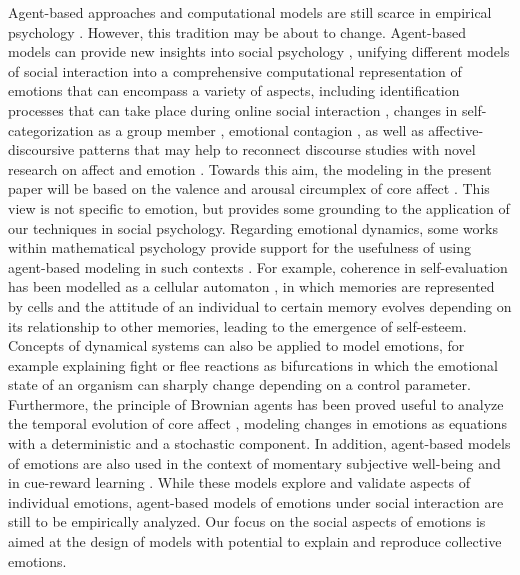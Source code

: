 \documentclass[nologo,url,11pt,a4paper]{ETHpaper}
\begin{document}
Agent-based approaches and computational models are still scarce in empirical psychology \cite{Kuppens2010}. 
However, this tradition may be about to change. 
Agent-based models can provide new insights into social psychology \cite{Smith2007}, unifying different models of social interaction into a comprehensive computational representation of emotions that can encompass
a variety of aspects, including identification processes \cite{Tajfel1978} that can take place during online social interaction \cite{Cheung2011}, changes in self-categorization as a group member \cite{Seger2009}, emotional contagion \cite{Hatfield1994,Weisbuch2008}, as well as affective-discoursive patterns that may help to reconnect discourse studies with novel research on affect and emotion \cite{Wetherell2013}. Towards this aim, the modeling in the present paper will be based on the valence and arousal circumplex of core affect \cite{Russell1980,Russell2009,Yik2011}.  
This view is not specific to emotion, but provides some grounding to the application of our techniques in social psychology. 
Regarding emotional dynamics, some works within mathematical psychology provide support for the usefulness of using agent-based modeling in such contexts \cite{Scherer2009}.
For example, coherence in self-evaluation has been modelled as a cellular automaton \cite{Vallacher2002},
in which memories are represented by cells and the attitude of an individual to certain memory evolves depending on its relationship to other memories, leading to the emergence of self-esteem.
Concepts of dynamical systems can also be applied to model emotions, for example explaining fight or flee reactions as bifurcations \cite{Sander2005} in which the emotional state of an organism can sharply change depending on a control parameter.
Furthermore, the principle of Brownian agents \cite{Schweitzer2003} has been proved useful to analyze the temporal evolution of core affect \cite{Kuppens2010}, modeling changes in emotions as equations with a deterministic and a stochastic component.
In addition, agent-based models of emotions are also used in the context of 
momentary subjective well-being \cite{Rutledge2014} and in cue-reward learning \cite{Watanabe2015}.
While these models explore and validate aspects of individual emotions, agent-based models of emotions under social interaction are still to be empirically analyzed.
Our focus on the social aspects of emotions is aimed at
the design of models with potential to explain and reproduce collective emotions.
\end{document}
